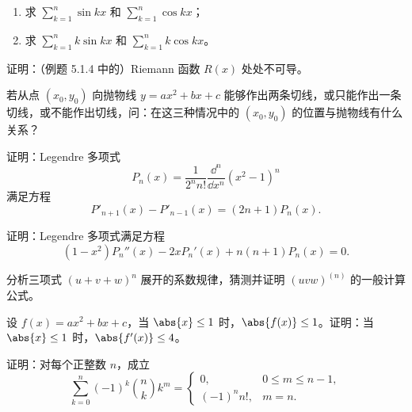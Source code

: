 \begin{xreferenceproblem}[1]
\begin{enumerate}[label=(\arabic*)]
    \item 求 $\displaystyle\sum_{k=1}^n\sin kx$ 和 $\displaystyle\sum_{k=1}^n\cos kx$；
    \item 求 $\displaystyle\sum_{k=1}^n k\sin kx$ 和 $\displaystyle\sum_{k=1}^n k\cos kx$。
  \end{enumerate}
\end{xreferenceproblem}

\begin{xreferenceproblem}[2]
证明：（例题 5.1.4 中的）Riemann 函数 $R(x)$ 处处不可导。
\end{xreferenceproblem}

\begin{xreferenceproblem}[3]
若从点 $(x_0,y_0)$ 向抛物线 $y=ax^2+bx+c$ 能够作出两条切线，或只能作出一条切线，或不能作出切线，问：在这三种情况中的 $(x_0,y_0)$ 的位置与抛物线有什么关系？
\end{xreferenceproblem}

\begin{xreferenceproblem}[4]
证明：Legendre 多项式
  \[
    P_n(x)=\frac1{2^nn!}\frac{\dd^n}{\dd x^n}(x^2-1)^n
  \]
  满足方程
  \[
    P'_{n+1}(x)-P'_{n-1}(x)=(2n+1)P_n(x).
  \]
\end{xreferenceproblem}

\begin{xreferenceproblem}[5]
证明：Legendre 多项式满足方程
  \[
    (1-x^2)P_n''(x)-2xP_n'(x)+n(n+1)P_n(x)=0.
  \]
\end{xreferenceproblem}

\begin{xreferenceproblem}[6]
分析三项式 $(u+v+w)^n$ 展开的系数规律，猜测并证明 $(uvw)^{(n)}$ 的一般计算公式。
\end{xreferenceproblem}

\begin{xreferenceproblem}[7]
设 $f(x)=ax^2+bx+c$，当 $\abs{x}\le1$ 时，$\abs{f(x)}\le1$。证明：当 $\abs{x}\le1$ 时，$\abs{f'(x)}\le4$。
\end{xreferenceproblem}

\begin{xreferenceproblem}[8]
证明：对每个正整数 $n$，成立
  \[
    \sum_{k=0}^n(-1)^k\binom nk k^m
    =
    \begin{cases}
      0, & 0\le m\le n-1,\\
      (-1)^n n!, & m=n.
    \end{cases}
  \]
\end{xreferenceproblem}

